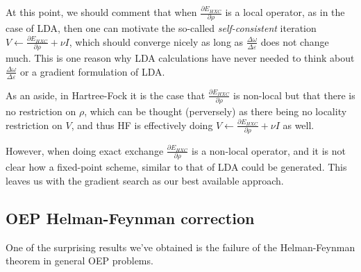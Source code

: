 \documentclass{article}
\newcommand{\Vscp}{V}
\begin{document}
At this point, we should comment that when
$\frac{\partial E_{HXC}}{\partial \rho}$ is a local operator, as in the
case of LDA, then one can motivate the so-called {\em self-consistent}
iteration $\Vscp \leftarrow \frac{\partial E_{HXC}}{\partial \rho} + \nu I$,
which should converge nicely as long as 
$\frac{\Delta \omega}{\Delta \varepsilon}$ does not change much.
This is one reason why LDA calculations have never needed 
to think about $\frac{\Delta \omega}{\Delta \varepsilon}$ or a gradient
formulation of LDA.

As an aside, in Hartree-Fock it is the case
that $\frac{\partial E_{HXC}}{\partial \rho}$ is non-local but that
there is no restriction on $\rho$, which can be thought (perversely)
as there being no locality restriction on $\Vscp$, and thus HF is effectively
doing $\Vscp \leftarrow \frac{\partial E_{HXC}}{\partial \rho} + \nu I$
as well.

However, when doing exact exchange
$\frac{\partial E_{HXC}}{\partial \rho}$ is a non-local operator, and
it is not clear how a fixed-point scheme, similar to that of LDA could
be generated.  This leaves us with the gradient search as our best
available approach.

\subsection{OEP Helman-Feynman correction}

One of the surprising results we've obtained is the failure of the
Helman-Feynman theorem in general OEP problems.
\end{document}
